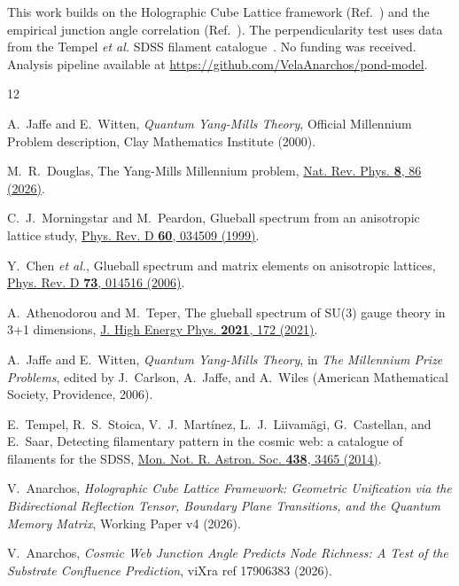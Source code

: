 \documentclass[aps,prd,twocolumn,superscriptaddress,nofootinbib]{revtex4-2}
\begin{document}
\begin{acknowledgments}
This work builds on the Holographic Cube Lattice framework
(Ref.~\cite{Anarchos2026a}) and the empirical junction angle
correlation (Ref.~\cite{Anarchos2026b}). The perpendicularity test
uses data from the Tempel \textit{et al.} SDSS filament
catalogue~\cite{Tempel2014}. No funding was received. Analysis
pipeline available at
\url{https://github.com/VelaAnarchos/pond-model}.
\end{acknowledgments}



\begin{thebibliography}{12}

A.~Jaffe and E.~Witten,
\textit{Quantum Yang-Mills Theory},
Official Millennium Problem description, Clay Mathematics Institute
(2000).

M.~R.~Douglas,
The Yang-Mills Millennium problem,
\href{https://doi.org/10.1038/s42254-025-00909-2}{Nat. Rev. Phys.
\textbf{8}, 86 (2026)}.

C.~J.~Morningstar and M.~Peardon,
Glueball spectrum from an anisotropic lattice study,
\href{https://doi.org/10.1103/PhysRevD.60.034509}{Phys. Rev. D
\textbf{60}, 034509 (1999)}.

Y.~Chen \textit{et al.},
Glueball spectrum and matrix elements on anisotropic lattices,
\href{https://doi.org/10.1103/PhysRevD.73.014516}{Phys. Rev. D
\textbf{73}, 014516 (2006)}.

A.~Athenodorou and M.~Teper,
The glueball spectrum of SU(3) gauge theory in 3+1 dimensions,
\href{https://doi.org/10.1007/JHEP11(2021)172}{J. High Energy Phys.
\textbf{2021}, 172 (2021)}.

A.~Jaffe and E.~Witten,
\textit{Quantum Yang-Mills Theory},
in \textit{The Millennium Prize Problems}, edited by J.~Carlson,
A.~Jaffe, and A.~Wiles (American Mathematical Society, Providence,
2006).

E.~Tempel, R.~S.~Stoica, V.~J.~Mart\'{i}nez, L.~J.~Liivam\"{a}gi,
G.~Castellan, and E.~Saar,
Detecting filamentary pattern in the cosmic web: a catalogue of
filaments for the SDSS,
\href{https://doi.org/10.1093/mnras/stt2454}{Mon. Not. R. Astron. Soc.
\textbf{438}, 3465 (2014)}.

V.~Anarchos,
\textit{Holographic Cube Lattice Framework: Geometric Unification via
the Bidirectional Reflection Tensor, Boundary Plane Transitions, and
the Quantum Memory Matrix},
Working Paper v4 (2026).

V.~Anarchos,
\textit{Cosmic Web Junction Angle Predicts Node Richness: A Test of
the Substrate Confluence Prediction},
viXra ref 17906383 (2026).

\end{thebibliography}
\end{document}
